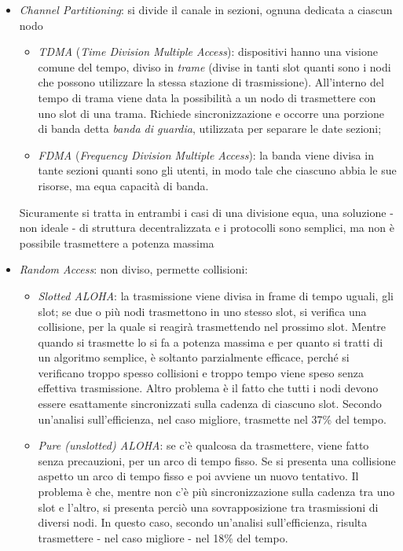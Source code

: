 \begin{itemize}
	\item \textit{Channel Partitioning}: si divide il canale in sezioni, ognuna dedicata a ciascun nodo
	\begin{itemize}
		\item \textit{TDMA} (\textit{Time Division Multiple Access}): dispositivi hanno una visione comune del tempo, diviso in \textit{trame} (divise in tanti slot quanti sono i nodi che possono utilizzare la stessa stazione di trasmissione). All'interno del tempo di trama viene data la possibilità a un nodo di trasmettere con uno slot di una trama. Richiede sincronizzazione e occorre una porzione di banda detta \textit{banda di guardia}, utilizzata per separare le date sezioni;
		\item \textit{FDMA} (\textit{Frequency Division Multiple Access}): la banda viene divisa in tante sezioni quanti sono gli utenti, in modo tale che ciascuno abbia le sue risorse, ma equa capacità di banda. 
	\end{itemize}
	Sicuramente si tratta in entrambi i casi di una divisione equa, una soluzione - non ideale - di struttura decentralizzata e i protocolli sono semplici, ma non è possibile trasmettere a potenza massima 
	\item \textit{Random Access}: non diviso, permette collisioni:
	\begin{itemize}
		\item \textit{Slotted ALOHA}: la trasmissione viene divisa in frame di tempo uguali, gli slot; se due o più nodi trasmettono in uno stesso slot, si verifica una collisione, per la quale si reagirà trasmettendo nel prossimo slot. Mentre quando si trasmette lo si fa a potenza massima e per quanto si tratti di un algoritmo semplice, è soltanto parzialmente efficace, perché si verificano troppo spesso collisioni e troppo tempo viene speso senza effettiva trasmissione. Altro problema è il fatto che tutti i nodi devono essere esattamente sincronizzati sulla cadenza di ciascuno slot. Secondo un'analisi sull'efficienza, nel caso migliore, trasmette nel 37\% del tempo.
		\item \textit{Pure (unslotted) ALOHA}: se c'è qualcosa da trasmettere, viene fatto senza precauzioni, per un arco di tempo fisso. Se si presenta una collisione aspetto un arco di tempo fisso e poi avviene un nuovo tentativo. Il problema è che, mentre non c'è più sincronizzazione sulla cadenza tra uno slot e l'altro, si presenta perciò una sovrapposizione tra trasmissioni di diversi nodi. In questo caso, secondo un'analisi sull'efficienza, risulta trasmettere - nel caso migliore - nel 18\% del tempo.

\end{itemize}
\end{itemize}

